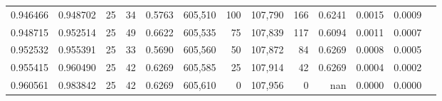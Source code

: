 \begin{tabular}{rrrrrrrrrrrrr}
0.946466 & 0.948702 &    25 &  34 &                                     0.5763 & 605,510 &     100 & 107,790 &     166 & 0.6241 & 0.0015 & 0.0009 \\
0.948715 & 0.952514 &    25 &  49 &                                     0.6622 & 605,535 &      75 & 107,839 &     117 & 0.6094 & 0.0011 & 0.0007 \\
0.952532 & 0.955391 &    25 &  33 &                                     0.5690 & 605,560 &      50 & 107,872 &      84 & 0.6269 & 0.0008 & 0.0005 \\
0.955415 & 0.960490 &    25 &  42 &                                     0.6269 & 605,585 &      25 & 107,914 &      42 & 0.6269 & 0.0004 & 0.0002 \\
0.960561 & 0.983842 &    25 &  42 &                                     0.6269 & 605,610 &       0 & 107,956 &       0 &    nan & 0.0000 & 0.0000 \\
\bottomrule
\end{tabular}
